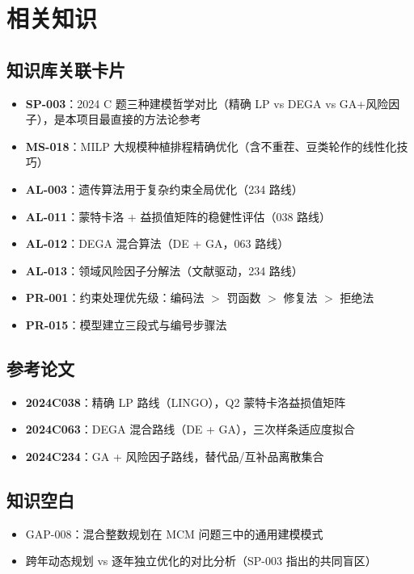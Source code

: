 \documentclass{internal-report}
\begin{document}
\section{相关知识}

\subsection{知识库关联卡片}
\begin{itemize}
    \item \textbf{SP-003}：2024 C 题三种建模哲学对比（精确 LP vs DEGA vs GA+风险因子），是本项目最直接的方法论参考
    \item \textbf{MS-018}：MILP 大规模种植排程精确优化（含不重茬、豆类轮作的线性化技巧）
    \item \textbf{AL-003}：遗传算法用于复杂约束全局优化（234 路线）
    \item \textbf{AL-011}：蒙特卡洛 + 益损值矩阵的稳健性评估（038 路线）
    \item \textbf{AL-012}：DEGA 混合算法（DE + GA，063 路线）
    \item \textbf{AL-013}：领域风险因子分解法（文献驱动，234 路线）
    \item \textbf{PR-001}：约束处理优先级：编码法 $>$ 罚函数 $>$ 修复法 $>$ 拒绝法
    \item \textbf{PR-015}：模型建立三段式与编号步骤法
\end{itemize}

\subsection{参考论文}
\begin{itemize}
    \item \textbf{2024C038}：精确 LP 路线（LINGO），Q2 蒙特卡洛益损值矩阵
    \item \textbf{2024C063}：DEGA 混合路线（DE + GA），三次样条适应度拟合
    \item \textbf{2024C234}：GA + 风险因子路线，替代品/互补品离散集合
\end{itemize}

\subsection{知识空白}
\begin{itemize}
    \item GAP-008：混合整数规划在 MCM 问题三中的通用建模模式
    \item 跨年动态规划 vs 逐年独立优化的对比分析（SP-003 指出的共同盲区）
\end{itemize}
\end{document}
